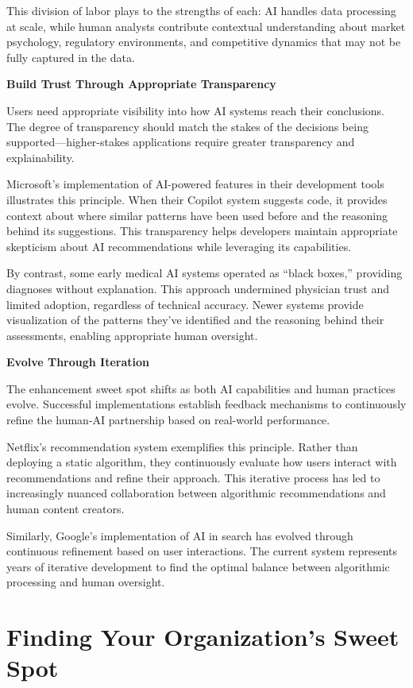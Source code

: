\documentclass[
  Letterpaper,
]{scrbook}
\begin{document}
This division of labor plays to the strengths of each: AI handles data
processing at scale, while human analysts contribute contextual
understanding about market psychology, regulatory environments, and
competitive dynamics that may not be fully captured in the data.

\textbf{Build Trust Through Appropriate
Transparency}

Users need appropriate visibility into how AI systems reach their
conclusions. The degree of transparency should match the stakes of the
decisions being supported---higher-stakes applications require greater
transparency and explainability.

Microsoft's implementation of AI-powered features in their development
tools illustrates this principle. When their Copilot system suggests
code, it provides context about where similar patterns have been used
before and the reasoning behind its suggestions. This transparency helps
developers maintain appropriate skepticism about AI recommendations
while leveraging its capabilities.

By contrast, some early medical AI systems operated as ``black boxes,''
providing diagnoses without explanation. This approach undermined
physician trust and limited adoption, regardless of technical accuracy.
Newer systems provide visualization of the patterns they've identified
and the reasoning behind their assessments, enabling appropriate human
oversight.

\textbf{Evolve Through Iteration}

The enhancement sweet spot shifts as both AI capabilities and human
practices evolve. Successful implementations establish feedback
mechanisms to continuously refine the human-AI partnership based on
real-world performance.

Netflix's recommendation system exemplifies this principle. Rather than
deploying a static algorithm, they continuously evaluate how users
interact with recommendations and refine their approach. This iterative
process has led to increasingly nuanced collaboration between
algorithmic recommendations and human content creators.

Similarly, Google's implementation of AI in
search has evolved through continuous refinement based on user
interactions. The current system represents years of iterative
development to find the optimal balance between algorithmic processing
and human oversight.

\section{Finding Your Organization's Sweet
Spot}\label{finding-your-organizations-sweet-spot}
\end{document}
